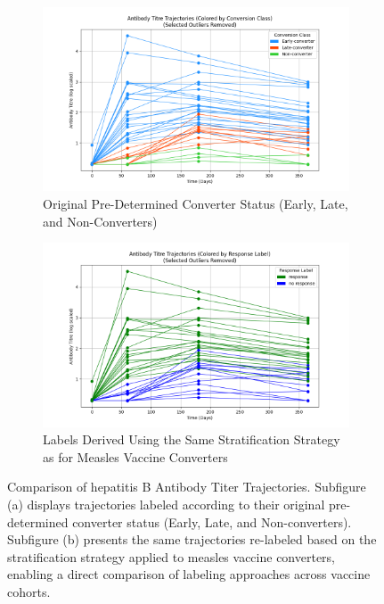 \documentclass[12pt,a4paper]{report}
\begin{document}
\begin{figure}[h!] 
    \centering 

    \begin{subfigure}[b]{0.49\textwidth}
        \centering
        \includegraphics[width=\textwidth]{images/Antibody_Titer_Trajectories_for_Hepatitis_original.png} 
        \caption{Original Pre-Determined Converter Status (Early, Late, and Non-Converters)} 
        \label{fig:antibody_titer_hepatitis_original}
    \end{subfigure}
    \hfill
    \begin{subfigure}[b]{0.49\textwidth}
        \centering
        \includegraphics[width=\linewidth]{images/Antibody_Titer_Trajectories_for_Hepatitis.png}
        \caption{Labels Derived Using the Same Stratification Strategy as for Measles Vaccine Converters} 
        \label{fig:antibody_titer_hepatitis} 
    \end{subfigure}

    \caption[Hepatitis B Antibody Titer Trajectories]{Comparison of hepatitis B Antibody Titer Trajectories. Subfigure (a) displays trajectories labeled according to their original pre-determined converter status (Early, Late, and Non-converters). Subfigure (b) presents the same trajectories re-labeled based on the stratification strategy applied to measles vaccine converters, enabling a direct comparison of labeling approaches across vaccine cohorts.} 
    \label{fig:antibody_titer_hepatitis_all} 
\end{figure}
\end{document}
